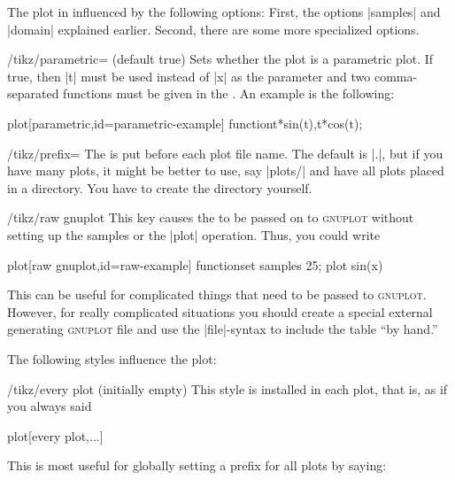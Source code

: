The plot in influenced by the following options: First, the options
|samples| and |domain| explained earlier. Second, there are some more
specialized options.

\begin{key}{/tikz/parametric= (default true)}
  Sets whether the plot is a parametric plot. If true, then |t| must
  be used instead of |x| as the parameter and two comma-separated
  functions must be given in the . An example is
  the following:
\begin{codeexample}[]
\tikz \draw[scale=0.5,domain=-3.141:3.141,smooth]
  plot[parametric,id=parametric-example] function{t*sin(t),t*cos(t)};
\end{codeexample}
\end{key}


\begin{key}{/tikz/prefix=}
  The  is put before each plot file name. The default is
  |\jobname.|, but 
  if you have many plots, it might be better to use, say |plots/| and
  have all plots placed in a directory. You have to create the
  directory yourself.
\end{key}

\begin{key}{/tikz/raw gnuplot}
  This key causes the  to be passed on to
  \textsc{gnuplot} without setting up the samples or the |plot|
  operation. Thus, you could write
\begin{codeexample}
plot[raw gnuplot,id=raw-example] function{set samples 25; plot sin(x)}
\end{codeexample}
  This can be 
  useful for complicated things that need to be passed to
  \textsc{gnuplot}. However, for really complicated situations you
  should create a special external generating \textsc{gnuplot} file
  and use the |file|-syntax to include the table ``by hand.''
\end{key}

The following styles influence the plot:
\begin{stylekey}{/tikz/every plot (initially \normalfont empty)}
  This style is installed in each plot, that is, as if you always said
\begin{codeexample}
  plot[every plot,...]
\end{codeexample}
 This is most useful for globally setting a prefix for all plots by saying:
\begin{codeexample}
\end{codeexample}
\end{stylekey}



